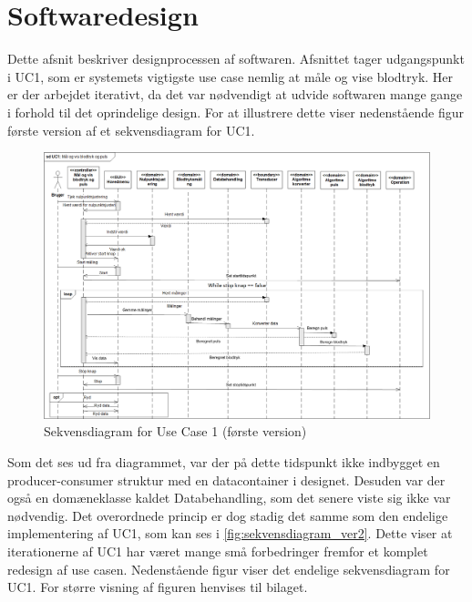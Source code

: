 \clearpage

\section{Softwaredesign}
Dette afsnit beskriver designprocessen af softwaren. Afsnittet tager udgangspunkt i UC1, som er systemets vigtigste use case nemlig at måle og vise blodtryk. Her er der arbejdet iterativt, da det var nødvendigt at udvide softwaren mange gange i forhold til det oprindelige design. For at illustrere dette viser nedenstående figur første version af et sekvensdiagram for UC1. 

\begin{figure}[h!]
	\centering
	\includegraphics[width=1\linewidth]{Arkitektur_og_design/Softwarearkitektur/sekvens_uc1_version1}
	\caption{Sekvensdiagram for Use Case 1 (første version)}
	\label{fig:sekvensdiagram_ver1}	
\end{figure}

Som det ses ud fra diagrammet, var der på dette tidspunkt ikke indbygget en producer-consumer struktur med en datacontainer i designet. Desuden var der også en domæneklasse kaldet Databehandling, som det senere viste sig ikke var nødvendig. Det overordnede princip er dog stadig det samme som den endelige implementering af UC1, som kan ses i \ref{fig:sekvensdiagram_ver2}. Dette viser at iterationerne af UC1 har været mange små forbedringer fremfor et komplet redesign af use casen. Nedenstående figur viser det endelige sekvensdiagram for UC1. For større visning af figuren henvises til bilaget. 

